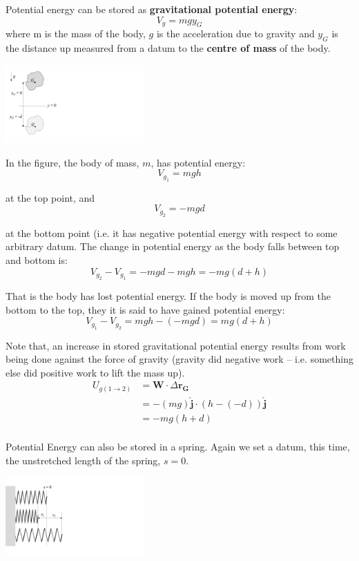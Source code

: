 \documentclass[12pt,letterpaper,twoside]{report}
\begin{document}
Potential energy can be stored as \textbf{gravitational potential energy}:
\[
V_g = mgy_G
\]
where m is the mass of the body, $g$ is the acceleration due to gravity and $y_G$ is the distance up measured from a datum to the \textbf{centre of mass} of the body.

 \includegraphics[trim={0cm 1cm 19cm 1cm},clip,width=0.4\textwidth, left]{Slide69}

In the figure, the body of mass, $m$, has potential energy:
\[
V_{g_1} = mgh
\]

at the top point, and 
\[
V_{g_2} = -mgd
\]

at the bottom point (i.e. it has negative potential energy with respect to some arbitrary datum.  The change in potential energy as the body falls between top and bottom is: 
\[
V_{g_2} - V_{g_1}= -mgd -mgh = -mg(d+h)
\]

That is the body has lost potential energy.  If the body is moved up from the bottom to the top, they it is said to have gained potential energy:
\[
V_{g_1} - V_{g_2}= mgh -(-mgd) = mg(d+h)
\]

Note that, an increase in stored gravitational potential energy results from work being done against the force of gravity (gravity did negative work – i.e. something else did positive work to lift the mass up).  
\begin{align*}
U_{g(1 \rightarrow 2)} &= \bm{W} \cdot \Delta \bm{r_G}\\
&= -(mg) \bm{\hat{j}} \cdot (h-(-d)) \bm{\hat{j}}\\
&= -mg(h+d)\\
\end{align*}

Potential Energy can also be stored in a spring.  Again we set a datum, this time, the unstretched length of the spring, $s=0$.  

 \includegraphics[trim={0cm 1cm 19cm 1cm},clip,width=0.4\textwidth, left]{Slide70}
\end{document}
